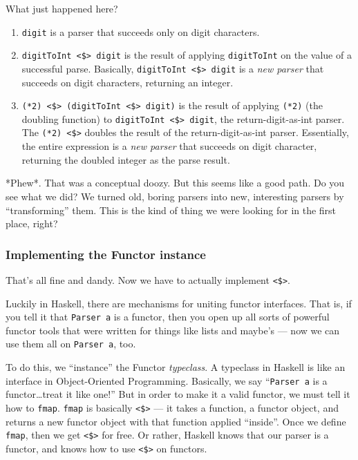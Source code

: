 \documentclass[]{article}
\begin{document}
What just happened here?

\begin{enumerate}
\def\labelenumi{\arabic{enumi}.}
\tightlist
\item
  \texttt{digit} is a parser that succeeds only on digit characters.
\item
  \texttt{digitToInt\ \textless{}\$\textgreater{}\ digit} is the result of
  applying \texttt{digitToInt} on the value of a successful parse. Basically,
  \texttt{digitToInt\ \textless{}\$\textgreater{}\ digit} is a \emph{new parser}
  that succeeds on digit characters, returning an integer.
\item
  \texttt{(*2)\ \textless{}\$\textgreater{}\ (digitToInt\ \textless{}\$\textgreater{}\ digit)}
  is the result of applying \texttt{(*2)} (the doubling function) to
  \texttt{digitToInt\ \textless{}\$\textgreater{}\ digit}, the
  return-digit-as-int parser. The \texttt{(*2)\ \textless{}\$\textgreater{}}
  doubles the result of the return-digit-as-int parser. Essentially, the entire
  expression is a \emph{new parser} that succeeds on digit character, returning
  the doubled integer as the parse result.
\end{enumerate}

*Phew*. That was a conceptual doozy. But this seems like a good path. Do you see
what we did? We turned old, boring parsers into new, interesting parsers by
``transforming'' them. This is the kind of thing we were looking for in the
first place, right?

\hypertarget{implementing-the-functor-instance}{%
\subsubsection{Implementing the Functor
instance}\label{implementing-the-functor-instance}}

That's all fine and dandy. Now we have to actually implement
\texttt{\textless{}\$\textgreater{}}.

Luckily in Haskell, there are mechanisms for uniting functor interfaces. That
is, if you tell it that \texttt{Parser\ a} is a functor, then you open up all
sorts of powerful functor tools that were written for things like lists and
maybe's --- now we can use them all on \texttt{Parser\ a}, too.

To do this, we ``instance'' the Functor \emph{typeclass}. A typeclass in Haskell
is like an interface in Object-Oriented Programming. Basically, we say
``\texttt{Parser\ a} is a functor\ldots treat it like one!'' But in order to
make it a valid functor, we must tell it how to \texttt{fmap}. \texttt{fmap} is
basically \texttt{\textless{}\$\textgreater{}} --- it takes a function, a
functor object, and returns a new functor object with that function applied
``inside''. Once we define \texttt{fmap}, then we get
\texttt{\textless{}\$\textgreater{}} for free. Or rather, Haskell knows that our
parser is a functor, and knows how to use \texttt{\textless{}\$\textgreater{}}
on functors.
\end{document}
